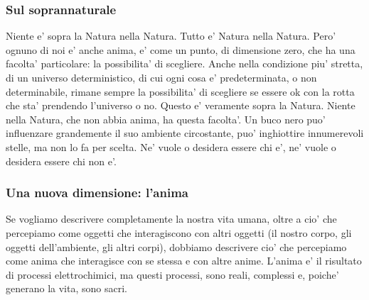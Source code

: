 %

\subsubsection{Sul soprannaturale}
Niente e' sopra la Natura nella Natura. Tutto e' Natura nella Natura. Pero' ognuno di noi e' anche anima, e' come un punto, di dimensione zero, che ha una facolta' particolare: la possibilita' di scegliere. Anche nella condizione piu' stretta, di un universo deterministico, di cui ogni cosa e' predeterminata, o non determinabile, rimane sempre la possibilita' di scegliere se essere ok con la rotta che sta' prendendo l'universo o no.  Questo e' veramente sopra la Natura. Niente nella Natura, che non abbia anima, ha questa facolta'. Un buco nero puo' influenzare grandemente il suo ambiente circostante, puo' inghiottire innumerevoli stelle, ma non lo fa per scelta. Ne' vuole o desidera essere chi e', ne' vuole o desidera essere chi non e'.

\subsubsection{Una nuova dimensione: l'anima}
Se vogliamo descrivere completamente la nostra vita umana, oltre a cio' che percepiamo come oggetti che interagiscono con altri oggetti (il nostro corpo, gli oggetti dell'ambiente, gli altri corpi), dobbiamo descrivere cio' che percepiamo come anima che interagisce con se stessa e con altre anime. L'anima e' il risultato di processi elettrochimici, ma questi processi, sono reali, complessi e, poiche' generano la vita, sono sacri. 

